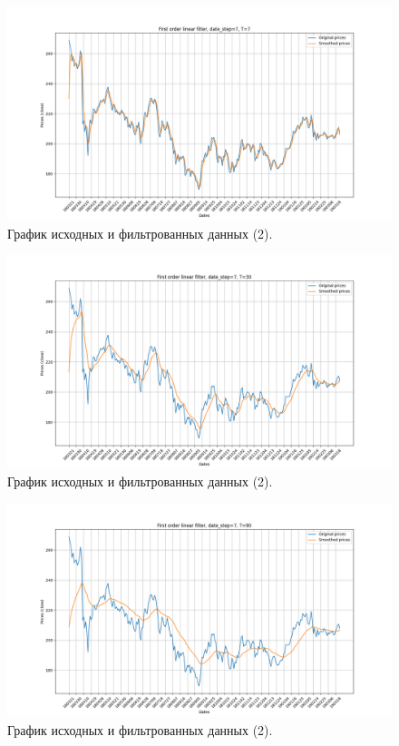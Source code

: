 \documentclass[a4paper, 12pt]{article}
\begin{document}
    \begin{figure}[H]
        \centering
        \includegraphics[scale=0.35]{2_7.png}
        \captionsetup{skip=0pt}
        \caption{График исходных и фильтрованных данных (2).}
        \label{fig:172}
    \end{figure}
    \begin{figure}[H]
        \centering
        \includegraphics[scale=0.35]{2_30.png}
        \captionsetup{skip=0pt}
        \caption{График исходных и фильтрованных данных (2).}
        \label{fig:302}
    \end{figure}
    \begin{figure}[H]
        \centering
        \includegraphics[scale=0.35]{2_90.png}
        \captionsetup{skip=0pt}
        \caption{График исходных и фильтрованных данных (2).}
        \label{fig:902}
    \end{figure}
\end{document}
